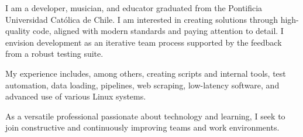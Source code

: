 

\begin{cvparagraph}

    I am a developer, musician, and educator graduated from the Pontificia
    Universidad Católica de Chile. I am interested in creating solutions
    through high-quality code, aligned with modern standards and paying
    attention to detail. I envision development as an iterative team process
    supported by the feedback from a robust testing suite.

    My experience includes, among others, creating scripts and internal tools,
    test automation, data loading, pipelines, web scraping, low-latency
    software, and advanced use of various Linux systems.

    As a versatile professional passionate about technology and learning, I
    seek to join constructive and continuously improving teams and work
    environments.

\end{cvparagraph}

